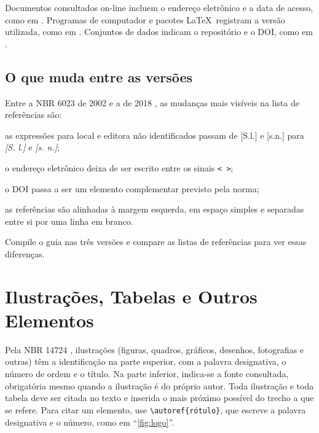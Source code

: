\documentclass[
	12pt, %
	openright, %
	oneside, %
	a4paper, %
	sumario=tradicional, %
	english, %
	brazil, %
]{abntex2}
\begin{document}
Documentos consultados on-line incluem o endereço eletrônico e a data de acesso, como em . Programas de computador e pacotes \LaTeX\ registram a versão utilizada, como em . Conjuntos de dados indicam o repositório e o DOI, como em .

\section{O que muda entre as versões}\label{sec:mudancas-referencias}

Entre a NBR 6023 de 2002 \cite{abnt6023-2002} e a de 2018 \cite{abnt6023}, as mudanças mais visíveis na lista de referências são:

\begin{alineas}
	\item as expressões para local e editora não identificados passam de [S.l.] e [s.n.] para \textit{[S. l.]} e \textit{[s. n.]};
	\item o endereço eletrônico deixa de ser escrito entre os sinais \texttt{< >};
	\item o DOI passa a ser um elemento complementar previsto pela norma;
	\item as referências são alinhadas à margem esquerda, em espaço simples e separadas entre si por uma linha em branco.
\end{alineas}

Compile o guia nas três versões e compare as listas de referências para ver essas diferenças.
\chapter{Ilustrações, Tabelas e Outros Elementos}\label{cap:elementos}

Pela NBR 14724 \cite{abnt14724}, ilustrações (figuras, quadros, gráficos, desenhos, fotografias e outras) têm a identificação na parte superior, com a palavra designativa, o número de ordem e o título. Na parte inferior, indica-se a fonte consultada, obrigatória mesmo quando a ilustração é do próprio autor. Toda ilustração e toda tabela deve ser citada no texto e inserida o mais próximo possível do trecho a que se refere. Para citar um elemento, use \verb|\autoref{rótulo}|, que escreve a palavra designativa e o número, como em ``\autoref{fig:logo}''.
\end{document}
